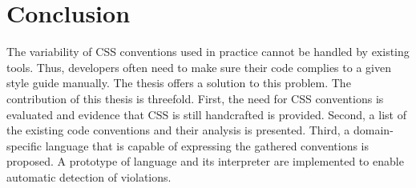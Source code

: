 \chapter{Conclusion}
\label{sec:conclusion}

The variability of CSS conventions used in practice cannot be handled by
existing tools. Thus, developers often need to make sure their code complies
to a given style guide manually. The thesis offers a solution to this problem.
The contribution of this thesis is threefold. First, the need for CSS
conventions is evaluated and evidence that CSS is still handcrafted is
provided. Second, a list of the existing code conventions and their analysis
is presented. Third, a domain-specific language that is capable of expressing
the gathered conventions is proposed. A prototype of language and its
interpreter are implemented to enable automatic detection of violations.
